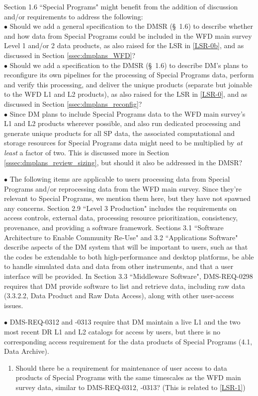 \documentclass[DM,lsstdraft,toc]{lsstdoc}
\begin{document}
Section 1.6 ``Special Programs" might benefit from the addition of discussion and/or requirements to address the following: \\
$\bullet$ Should we add a general specification to the DMSR (\S~1.6) to describe whether and how data from Special Programs could be included in the WFD main survey Level 1 and/or 2 data products, as also raised for the LSR in \ref{LSR-0b}, and as discussed in Section \ref{ssec:dmplans_WFD}? \\
$\bullet$ Should we add a specification to the DMSR (\S~1.6) to describe DM's plans to reconfigure its own pipelines for the processing of Special Programs data, perform and verify this processing, and deliver the unique products (separate but joinable to the WFD L1 and L2 products), as also raised for the LSR in \ref{LSR-0}, and as discussed in Section \ref{ssec:dmplans_reconfig}? \\
$\bullet$ Since DM plans to include Special Programs data to the WFD main survey's L1 and L2 products wherever possible, and also run dedicated processing and generate unique products for all SP data, the associated computational and storage resources for Special Programs data might need to be multiplied by {\it at least} a factor of two. This is discussed more in Section \ref{sssec:dmplans_review_sizing}, but should it also be addressed in the DMSR?

$\bullet$ The following items are applicable to users processing data from Special Programs and/or reprocessing data from the WFD main survey. Since they're relevant to Special Programs, we mention them here, but they have not spawned any concerns. Section 2.9 ``Level 3 Production" includes the requirements on access controls, external data, processing resource prioritization, consistency, provenance, and providing a software framework. Sections 3.1 ``Software Architecture to Enable Community Re-Use" and 3.2 ``Applications Software" describe aspects of the DM system that will be important to users, such as that the codes be extendable to both high-performance and desktop platforms, be able to handle simulated data and data from other instruments, and that a user interface will be provided. In Section 3.3 ``Middleware Software", DMS-REQ-0298 requires that DM provide software to list and retrieve data, including raw data (3.3.2.2, Data Product and Raw Data Access), along with other user-access issues.

$\bullet$ DMS-REQ-0312 and -0313 require that DM maintain a live L1 and the two most recent DR L1 and L2 catalogs for access by users, but there is no corresponding access requirement for the data products of Special Programs (4.1, Data Archive).
\begin{enumerate}[topsep=-10pt,after=\vspace{10pt},label= \textbf{Concern \Roman*.},resume] \item \label{DMSR-10} Should there be a requirement for maintenance of user access to data products of Special Programs with the same timescales as the WFD main survey data, similar to DMS-REQ-0312, -0313? (This is related to \ref{LSR-1}) \end{enumerate}
\end{document}
